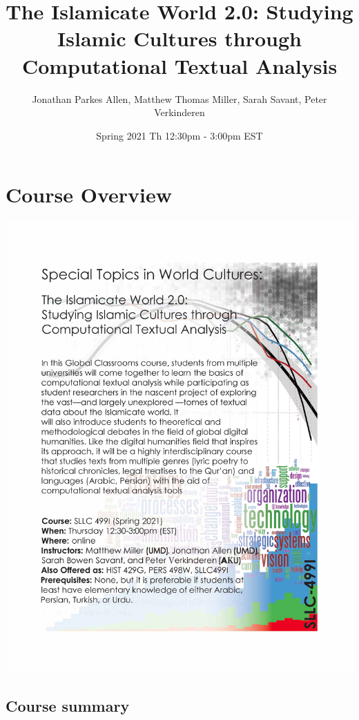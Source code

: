 \documentclass[
]{book}
\title{The Islamicate World 2.0: Studying Islamic Cultures through Computational Textual Analysis}
\author{Jonathan Parkes Allen, Matthew Thomas Miller, Sarah Savant, Peter Verkinderen}
\date{Spring 2021 Th 12:30pm - 3:00pm EST}
\begin{document}
\maketitle

{
\setcounter{tocdepth}{1}
\tableofcontents
}
\hypertarget{course-overview}{%
\chapter{Course Overview}\label{course-overview}}

\includegraphics{img/courseflyer.jpg}

\hypertarget{course-summary}{%
\section{Course summary}\label{course-summary}}
\end{document}
